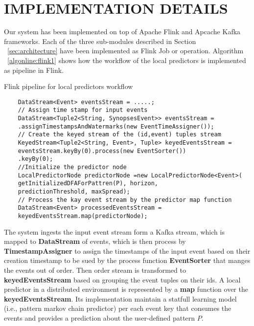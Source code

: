 

\section{IMPLEMENTATION DETAILS}

Our system has been implemented on top of Apache Flink and Apcache Kafka frameworks. Each of the three sub-modules described in Section  ~\ref{sec:architecture} have been implemented as Flink Job or operation. Algorithm ~\ref{algonline:flink1} shows how the workflow of the local predictors is implemented as pipeline in Flink.

\begin{algorithm}
	\caption{Flink pipeline for local predictors workflow} 
	\begin{algorithmic}[1] 
		\Statex 
	\begin{lstlisting}
	DataStream<Event> eventsStream = .....;	
	// Assign time stamp for input events 
	DataStream<Tuple2<String, SynopsesEvent>> eventsStream =
	.assignTimestampsAndWatermarks(new EventTimeAssigner());	
	// Create the keyed stream of the (id,event) tuples stream
	KeyedStream<Tuple2<String, Event>, Tuple> keyedEventsStream =
	eventsStream.keyBy(0).process(new EventSorter())
	.keyBy(0);	
	//Initialize the predictor node 
	LocalPredictorNode predictorNode =new LocalPredictorNode<Event>(
	getInitializedDFAForPattren(P), horizon,
	predictionThreshold, maxSpread);
	// Process the kay event stream by the predictor map function 
	DataStream<Event> processedEventsStream =
	keyedEventsStream.map(predictorNode);
	\end{lstlisting}
	\end{algorithmic}
	\label{algonline:flink1}
\end{algorithm}


The system ingests the input event stream form a Kafka stream, which is mapped to \textbf{DataStream} of events, which is then process by \textbf{TimestampAssigner} to assign the timestamps of the input event based on their creation timestamp to be sued by the process function \textbf{EventSorter} that manges the events out of order. Then order stream is transformed to \textbf{keyedEventsStream}  based on grouping the event tuples  on their ids. A local predictor in a distributed environment is represented by a \textbf{map} function over the \textbf{keyedEventsStream}. Its implementation maintain a statfull learning model (i.e., pattern markov chain predictor) per each event key that consumes the events and  provides a prediction about the user-defined pattern $P$.        